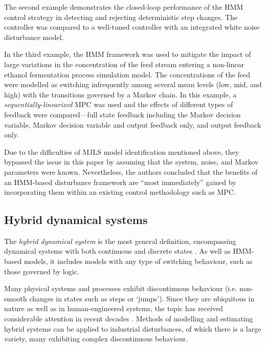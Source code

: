 The second example demonstrates the closed-loop performance of the \gls{HMM} control strategy in detecting and rejecting deterministic step changes. The controller was compared to a well-tuned controller with an integrated white noise disturbance model.

In the third example, the \gls{HMM} framework was used to mitigate the impact of large variations in the concentration of the feed stream entering a non-linear ethanol fermentation process simulation model. The concentrations of the feed were modelled as switching infrequently among several mean levels (low, mid, and high) with the transitions governed by a Markov chain. In this example, a \textit{sequentially-linearized} \gls{MPC} \citep{lee_extended_1994} was used and the effects of different types of feedback were compared---full state feedback including the Markov decision variable, Markov decision variable and output feedback only, and output feedback only.

Due to the difficulties of \gls{MJLS} model identification mentioned above, they bypassed the issue in this paper by assuming that the system, noise, and Markov parameters were known. Nevertheless, the authors concluded that the benefits of an \gls{HMM}-based disturbance framework are ``most immediately'' gained by incorporating them within an existing control methodology such as \gls{MPC}. \cite{wong_realistic_2009}

\subsection{Hybrid dynamical systems} \label{sec:lit-hybrid}

The \textit{hybrid dynamical system} is the most general definition, encompassing dynamical systems with both continuous and discrete states \citep{van_der_schaft_introduction_2000}. As well as \gls{HMM}-based models, it includes models with any type of switching behaviour, such as those governed by logic.

Many physical systems and processes exhibit discontinuous behaviour (i.e. non-smooth changes in states such as steps or ‘jumps’). Since they are ubiquitous in nature as well as in human-engineered systems, the topic has received considerable attention in recent decades \citep{sworder_boyd_1999, bemporad_identification_2001, costa_discrete-time_2005, camacho_model_2010, djemai_hybrid_2014, estrada_hybrid_2014, guo_moving_2013, botha_hybrid_2018, bemporad_fitting_2018, oliveira_iterative_2020, piga_estimation_2020}. Methods of modelling and estimating hybrid systems can be applied to industrial disturbances, of which there is a large variety, many exhibiting complex discontinuous behaviour.

